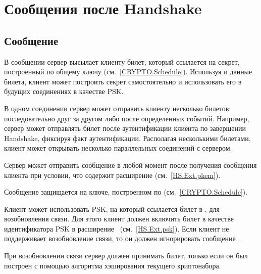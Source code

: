 \section{Сообщения после Handshake}\label{HS.Post} 
        
\subsection{Сообщение }\label{HS.NST} 

В сообщении  сервер высылает клиенту билет, который
ссылается на секрет, построенный по общему ключу 
 (см.~\ref{CRYPTO.Schedule}).
%
Используя  и данные билета, клиент может 
построить секрет самостоятельно и использовать его в будущих соединениях в 
качестве PSK.

В одном соединении сервер может отправить клиенту несколько билетов:
последовательно друг за другом либо после определенных событий.
%
Например, сервер может отправлять билет после аутентификации клиента по 
завершении Handshake, фиксируя факт аутентификации. 
%
Располагая несколькими билетами, клиент может открывать несколько параллельных 
соединений с сервером.

Сервер может отправить сообщение  в любой момент после  
получения сообщения  клиента при условии, что 
 содержит расширение 
 (см.~\ref{HS.Ext.pkem}).


Сообщение  защищается на ключе, построенном по 
 (см.~\ref{CRYPTO.Schedule}). 

Клиент может использовать PSK, на который ссылается билет в 
, для возобновления связи. Для этого клиент должен 
включить билет в качестве идентификатора PSK в 
расширение~ (см.~\ref{HS.Ext.psk}).
%
Если клиент не поддерживает возобновление связи, то он должен игнорировать 
сообщение .


При возобновлении связи сервер должен принимать билет, только если он был 
построен с помощью алгоритма хэширования текущего криптонабора.

